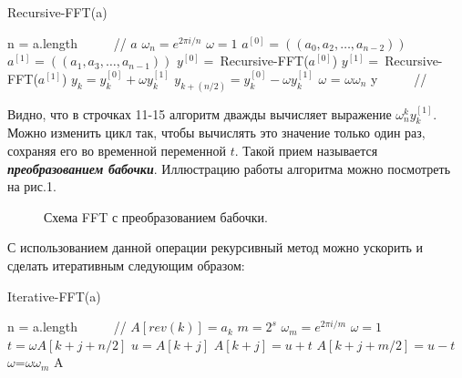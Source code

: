 \documentclass[a4paper,12pt]{article}
\theoremstyle{plain} %
\theoremstyle{definition} %
\theoremstyle{remark} %
\theoremstyle{definition}
\theoremstyle{definition}
\begin{document}
		\begin{algorithm}[h!]
			\caption{Recursive-FFT(a)}
			\label{Rec-FFT}
			\begin{algorithmic}[1]
				\STATE n = a.length \ \ \ \ \ // 
				\RETURN $a$
				\ENDIF
				\STATE $\omega_{n}=e^{2\pi i/n}$
				\STATE $\omega=1$
				\STATE $a^{[0]}=((a_{0}, a_{2},\dots, a_{n-2}))$
				\STATE $a^{[1]}=((a_{1}, a_{3},\dots, a_{n-1}))$
				\STATE $y^{[0]}= \ $Recursive-FFT($a^{[0]}$)
				\STATE $y^{[1]}= \ $Recursive-FFT($a^{[1]}$)
				\STATE $y_{k}=y_{k}^{[0]}+\omega y_{k}^{[1]}$
				\STATE $y_{k+(n/2)}=y_{k}^{[0]}-\omega y_{k}^{[1]}$
				\STATE $\omega$ = $\omega\omega_{n}$
				\ENDFOR
				\RETURN y \ \ \ \ \ // 
				
			\end{algorithmic}
		\end{algorithm}
	
	Видно, что в строчках 11-15 алгоритм дважды вычисляет выражение $\omega_{n}^{k}y_{k}^{[1]}.$ Можно изменить цикл так, чтобы вычислять это значение только один раз, сохраняя его во временной переменной $t$. Такой прием называется \textrm{\textbf{\textit{преобразованием бабочки}}}. Иллюстрацию работы алгоритма можно посмотреть на рис.1.
	
	
	
	\begin{figure}[H]
		\caption{Схема FFT с преобразованием бабочки.}
	\end{figure}

	С использованием данной операции рекурсивный метод можно ускорить и сделать итеративным следующим образом:
	
	\begin{algorithm}[h!]
		\caption{Iterative-FFT(a)}
		\label{Iter-FFT}
		\begin{algorithmic}[1]
			\STATE n = a.length \ \ \ \ \ // 
			\STATE $A[rev(k)]=a_{k}$	
			\ENDFOR
			\STATE $m=2^{s}$
			\STATE $\omega_{m}=e^{2\pi i/m}$
				\STATE $\omega=1$
					\STATE $t=\omega A[k+j+n/2]$
					\STATE $u=A[k+j]$
					\STATE $A[k+j]=u+t$
					\STATE $A[k+j+m/2]=u-t$
					\STATE $\omega$=$\omega\omega_{m}$
					\ENDFOR
				\ENDFOR
			\ENDFOR		
			\RETURN A
		\end{algorithmic}
	\end{algorithm}
\end{document}
